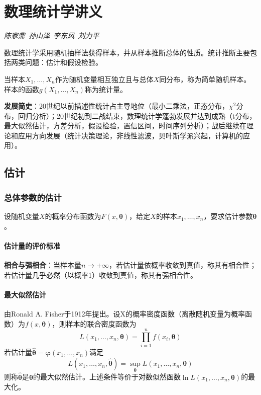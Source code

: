 
\chapter{数理统计学讲义}

\par \Large \emph{陈家鼎\ 孙山泽\ 李东风\ 刘力平} 

\normalsize

\par 数理统计学采用随机抽样法获得样本，并从样本推断总体的性质。统计推断主要包括两类问题：估计和假设检验。
\par 当样本$X_1,\dots, X_n$作为随机变量相互独立且与总体$X$同分布，称为简单随机样本。样本的函数$g(X_1,\dots, X_n)$称为统计量。
\par \textbf{发展简史}：20世纪以前描述性统计占主导地位（最小二乘法，正态分布，$\chi^2$分布，回归分析）；20世纪初到二战结束，数理统计学蓬勃发展并达到成熟（t分布，最大似然估计，方差分析，假设检验，置信区间，时间序列分析）；战后继续在理论和应用方向发展（统计决策理论，非线性滤波，贝叶斯学派兴起，计算机的应用）。

\section{估计}

\subsection{总体参数的估计}

设随机变量$X$的概率分布函数为$F(x,\boldsymbol{\theta})$，给定$X$的样本$x_1,\dots,x_n$，要求估计参数$\boldsymbol{\theta}$。

\subsubsection{估计量的评价标准}

\par \textbf{相合与强相合}：当样本量$n\to +\infty$，若估计量依概率收敛到真值，称其有相合性；若估计量几乎必然（以概率1）收敛到真值，称其有强相合性。

\subsubsection{最大似然估计}

\par 由Ronald A. Fisher于1912年提出。设X的概率密度函数（离散随机变量为概率函数）为$f(x,\boldsymbol{\theta})$，则样本的联合密度函数为
\begin{equation}
L(x_1,\dots,x_n,\boldsymbol{\theta})=\prod_{i=1}^n f(x_i,\boldsymbol{\theta})
\end{equation}
若估计量$\hat{\boldsymbol{\theta}}=\boldsymbol{\varphi}(x_1,\dots,x_n)$满足
\begin{equation}
L(x_1,\dots,x_n,\hat{\boldsymbol{\theta}})=\sup_{\boldsymbol{\theta}}L(x_1,\dots,x_n,\boldsymbol{\theta})
\end{equation}
则称$\hat{\boldsymbol{\theta}}$是${\boldsymbol{\theta}}$的最大似然估计。上述条件等价于对数似然函数$\ln L(x_1,\dots,x_n,\boldsymbol{\theta})$的最大化。

